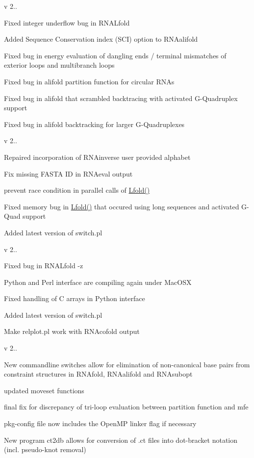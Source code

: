 v 2..
\begin{DoxyItemize}
\item Fixed integer underflow bug in R\+N\+A\+Lfold
\item Added Sequence Conservation index (S\+CI) option to R\+N\+Aalifold
\item Fixed bug in energy evaluation of dangling ends / terminal mismatches of exterior loops and multibranch loops
\item Fixed bug in alifold partition function for circular R\+N\+As
\item Fixed bug in alifold that scrambled backtracing with activated G-\/\+Quadruplex support
\item Fixed bug in alifold backtracking for larger G-\/\+Quadruplexes
\end{DoxyItemize}

v 2..
\begin{DoxyItemize}
\item Repaired incorporation of R\+N\+Ainverse user provided alphabet
\item Fix missing F\+A\+S\+TA ID in R\+N\+Aeval output
\item prevent race condition in parallel calls of \hyperlink{group__local__mfe__fold_ga16e5a70e60835bb969eaecbe6482f1be}{Lfold()}
\item Fixed memory bug in \hyperlink{group__local__mfe__fold_ga16e5a70e60835bb969eaecbe6482f1be}{Lfold()} that occured using long sequences and activated G-\/\+Quad support
\item Added latest version of switch.\+pl
\end{DoxyItemize}

v 2..
\begin{DoxyItemize}
\item Fixed bug in R\+N\+A\+Lfold -\/z
\item Python and Perl interface are compiling again under Mac\+O\+SX
\item Fixed handling of C arrays in Python interface
\item Added latest version of switch.\+pl
\item Make relplot.\+pl work with R\+N\+Acofold output
\end{DoxyItemize}

v 2..
\begin{DoxyItemize}
\item New commandline switches allow for elimination of non-\/canonical base pairs from constraint structures in R\+N\+Afold, R\+N\+Aalifold and R\+N\+Asubopt
\item updated moveset functions
\item final fix for discrepancy of tri-\/loop evaluation between partition function and mfe
\item pkg-\/config file now includes the Open\+MP linker flag if necessary
\item New program ct2db allows for conversion of .ct files into dot-\/bracket notation (incl. pseudo-\/knot removal)
\end{DoxyItemize}

